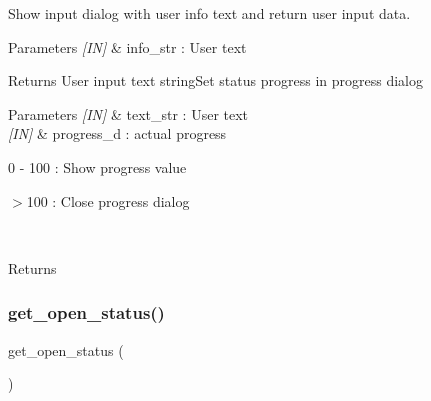 Show input dialog with user info text and return user input data. 


\begin{DoxyCode}{0}
\end{DoxyCode}



\begin{DoxyParams}{Parameters}
{\em \mbox{[}\+I\+N\mbox{]}} & info\+\_\+str \+: User text \\
\hline
\end{DoxyParams}
\begin{DoxyReturn}{Returns}
User input text string\+Set status progress in progress dialog
\end{DoxyReturn}

\begin{DoxyCode}{0}
\DoxyCodeLine{\textcolor{comment}{// Show 50\% progress}}
\DoxyCodeLine{\textcolor{comment}{// Close dialog}}
\end{DoxyCode}



\begin{DoxyParams}{Parameters}
{\em \mbox{[}\+I\+N\mbox{]}} & text\+\_\+str \+: User text \\
\hline
{\em \mbox{[}\+I\+N\mbox{]}} & progress\+\_\+d \+: actual progress \begin{DoxyItemize}
\item 0 -\/ 100 \+: Show progress value \item $>$100 \+: Close progress dialog \end{DoxyItemize}
\\
\hline
\end{DoxyParams}
\begin{DoxyReturn}{Returns}

\end{DoxyReturn}
\mbox{\label{classmain__frame_a7e4ce3b50be33239672b4a51e974baa0}} 
\subsubsection{get\_open\_status()}
{\footnotesize\ttfamily get\+\_\+open\+\_\+status (\begin{DoxyParamCaption}{ }\end{DoxyParamCaption})}



